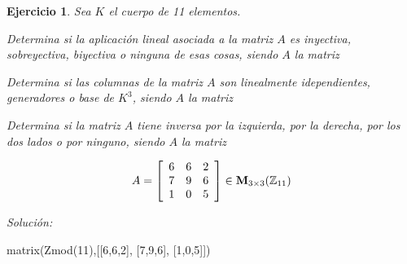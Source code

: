 \documentclass[12pt]{amsart}
\newtheorem{ejer}{Ejercicio}
\begin{document}
\begin{ejer} Sea $K$ el cuerpo de 11 elementos.
\newline
\noindent\begin{minipage}{\textwidth}
\begin{tcolorbox}[colback = green!20!white,title=Versión Aplicaciones]
Determina si la aplicaci\'on lineal asociada a la matriz $A$ es inyectiva, sobreyectiva, biyectiva o ninguna de esas cosas, siendo $A$ la matriz \end{tcolorbox}
\end{minipage} \newline
\noindent\begin{minipage}{\textwidth}
\begin{tcolorbox}[colback = blue!20!white,title=Versión Vectores]
Determina si las columnas de la matriz $A$ son linealmente idependientes, generadores o base de $K^{3}$, siendo $A$ la matriz \end{tcolorbox}
\end{minipage} \newline
\noindent\begin{minipage}{\textwidth} 
\begin{tcolorbox}[colback = red!20!white,title=Versión Inversas]
Determina si la matriz $A$ tiene inversa por la izquierda, por la derecha, por los dos lados o por ninguno, siendo $A$ la matriz 
\end{tcolorbox}
\end{minipage}
\[ A = \left[\begin{array}{rrr}
6 & 6 & 2 \\
7 & 9 & 6 \\
1 & 0 & 5
\end{array}\right] \in {\bf M}_{3\times 3}({\mathbb Z}_{11})\]
\end{ejer}

{\it Soluci\'on:}

\begin{sageblock}
matrix(Zmod(11),[[6,6,2],
[7,9,6],
[1,0,5]])
\end{sageblock}

\end{document}
